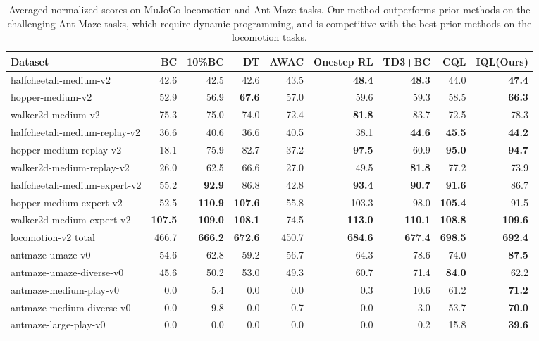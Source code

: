 \documentclass{article} %
\def\ourname{IQL\xspace}
\begin{document}
\begin{table}[t]\centering
\begin{threeparttable}
\caption{Averaged normalized scores on MuJoCo locomotion and Ant Maze tasks. Our method outperforms prior methods on the challenging Ant Maze tasks, which require dynamic programming, and is competitive with the best prior methods on the locomotion tasks.  %
}\label{tab:d4rl}
\scriptsize
\begin{tabular}{l||rrrrrrr|r}
Dataset &BC &10\%BC &DT &AWAC &Onestep RL &TD3+BC &CQL & \ourname (Ours) \\\hline
halfcheetah-medium-v2 &42.6 &42.5 &42.6 &43.5 &\textbf{48.4} &\textbf{48.3} &44.0 &\textbf{47.4} \\
hopper-medium-v2 &52.9 &56.9 &\textbf{67.6} &57.0 &59.6 &59.3 &58.5 &\textbf{66.3} \\
walker2d-medium-v2 &75.3 &75.0 &74.0 &72.4 &\textbf{81.8} &83.7 &72.5 &78.3 \\
halfcheetah-medium-replay-v2 &36.6 &40.6 &36.6 &40.5 &38.1 &\textbf{44.6} &\textbf{45.5} &\textbf{44.2} \\
hopper-medium-replay-v2 &18.1 &75.9 &82.7 &37.2 &\textbf{97.5} &60.9 &\textbf{95.0} &\textbf{94.7} \\
walker2d-medium-replay-v2 &26.0 &62.5 &66.6 &27.0 &49.5 &\textbf{81.8} &77.2 &73.9 \\
halfcheetah-medium-expert-v2 &55.2 &\textbf{92.9} &86.8 &42.8 &
\textbf{93.4} &\textbf{90.7} &\textbf{91.6} &86.7 \\
hopper-medium-expert-v2 &52.5 &\textbf{110.9} &\textbf{107.6} &55.8 &103.3 &98.0 &\textbf{105.4} &91.5 \\
walker2d-medium-expert-v2 &\textbf{107.5} &\textbf{109.0} &\textbf{108.1} &74.5 &\textbf{113.0} &\textbf{110.1} &\textbf{108.8} &\textbf{109.6} \\ \hline
locomotion-v2 total &466.7 &\textbf{666.2} &\textbf{672.6} &450.7 &\textbf{684.6} &\textbf{677.4} &\textbf{698.5} &\textbf{692.4} \\ \hline
antmaze-umaze-v0 &54.6 &62.8 &59.2 &56.7 &64.3 &78.6 &74.0 &\textbf{87.5} \\
antmaze-umaze-diverse-v0 &45.6 &50.2 &53.0 &49.3 &60.7 &71.4 &\textbf{84.0} &62.2 \\
antmaze-medium-play-v0 &0.0 &5.4 &0.0 &0.0 &0.3 &10.6 &61.2 &\textbf{71.2} \\
antmaze-medium-diverse-v0 &0.0 &9.8 &0.0 &0.7 &0.0 &3.0 &53.7 &\textbf{70.0} \\
antmaze-large-play-v0 &0.0 &0.0 &0.0 &0.0 &0.0 &0.2 &15.8 &\textbf{39.6} \\

\end{tabular}
\end{threeparttable}
\end{table}
\end{document}
